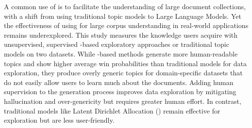A common use of  is to facilitate the understanding of large
document collections, 
with a shift from using traditional topic models to Large Language Models.
%
Yet the effectiveness of using \mm{} for large corpus understanding in real-world
applications remains underexplored.
%
%
This study measures the knowledge users acquire with unsupervised, supervised \mm{}-based exploratory approaches or traditional topic models on two datasets.
%
%
%
While \mm{}-based methods generate more human-readable topics and show higher average win probabilities than traditional models for data exploration, 
they produce overly generic topics for domain-specific datasets
that do not easily allow users to learn much about the documents.
%
Adding human supervision to the \mm{} generation process improves data
exploration by mitigating hallucination and over-genericity but requires greater human effort.
%
In contrast, traditional models like Latent Dirichlet Allocation
(\lda{}) remain effective for exploration but are less user-friendly.
